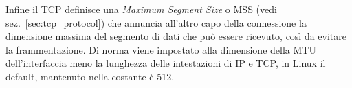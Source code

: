 Infine il TCP definisce una \textit{Maximum Segment Size} o MSS (vedi
sez.~\ref{sec:tcp_protocol}) che annuncia all'altro capo della connessione la
dimensione massima del segmento di dati che può essere ricevuto, così da
evitare la frammentazione. Di norma viene impostato alla dimensione della MTU
dell'interfaccia meno la lunghezza delle intestazioni di IP e TCP, in Linux il
default, mantenuto nella costante  è 512.




